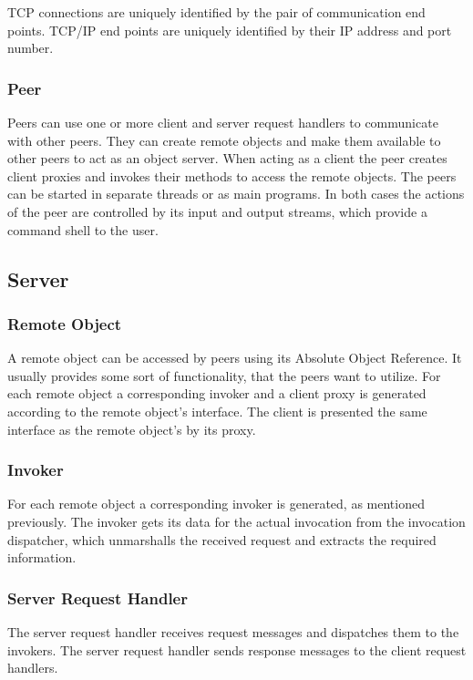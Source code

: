 TCP connections are uniquely identified by the pair of communication end points.
TCP/IP end points are uniquely identified by their IP address and port number.

\subsubsection{Peer}

Peers can use one or more client and server request handlers to communicate with other peers.
They can create remote objects and make them available to other peers to act as an object server.
When acting as a client the peer creates client proxies and invokes their methods to access the remote objects.
The peers can be started in separate threads or as main programs.
In both cases the actions of the peer are controlled by its input and output streams, which provide a command shell to the user.

\subsection{Server}

\subsubsection{Remote Object}
A remote object can be accessed by peers using its Absolute Object Reference. It usually provides some sort of functionality, that the peers want to utilize. For each remote object a corresponding invoker and a client proxy is generated according to the remote object's interface. The client is presented the same interface as the remote object's by its proxy.

\subsubsection{Invoker}
For each remote object a corresponding invoker is generated, as mentioned previously. The invoker gets its data for the actual invocation from the invocation dispatcher, which unmarshalls the received request and extracts the required information.

\subsubsection{Server Request Handler}

The server request handler receives request messages and dispatches them to the invokers.
The server request handler sends response messages to the client request handlers.

